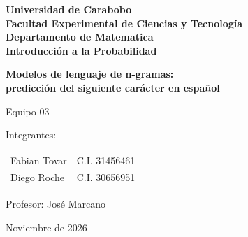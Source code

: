 \documentclass[11pt,letterpaper]{article}
\begin{document}
	
	\begin{titlepage}
		\centering
		\begin{minipage}[c]{0.62\textwidth}
			\centering
			\onehalfspacing
			{\large \textbf{Universidad de Carabobo}} \\
			{\normalsize \textbf{Facultad Experimental de Ciencias y Tecnología}} \\
			{\normalsize \textbf{Departamento de Matematica}} \\
			{\normalsize \textbf{Introducción a la Probabilidad}}
		\end{minipage}
		\par %
		
		\vspace*{3cm}
		{\LARGE\bfseries Modelos de lenguaje de n-gramas:\\[4pt]
			predicción del siguiente carácter en español\par}
		\vspace{1.5cm}\par
		\vspace{0.8cm}
		{\large Equipo 03\par}
		\vspace{1cm}
		{\large Integrantes:\par}
		\begin{tabular}{ll}
			Fabian Tovar & C.I. 31456461 \\
			Diego Roche & C.I. 30656951 \\
		\end{tabular}
		\vfill
		{\large Profesor: José Marcano\par}
		\vspace{0.5cm}
		{\large Noviembre de 2026\par}
	\end{titlepage}
	
\end{document}
